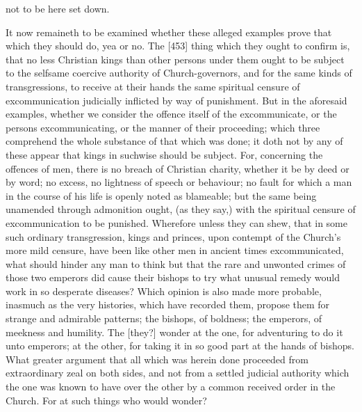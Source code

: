 not to be here set down.

It now remaineth to be examined whether these alleged examples prove that which they should do, yea or no. The [453] thing which they ought to confirm is, that no less Christian kings than other persons under them ought to be subject to the selfsame coercive authority of Church-governors, and for the same kinds of transgressions, to receive at their hands the same spiritual censure of excommunication judicially inflicted by way of punishment. But in the aforesaid examples, whether we consider the offence itself of the excommunicate, or the persons excommunicating, or the manner of their proceeding; which three comprehend the whole substance of that which was done; it doth not by any of these appear that kings in suchwise should be subject. For, concerning the offences of men, there is no breach of Christian charity, whether it be by deed or by word; no excess, no lightness of speech or behaviour; no fault for which a man in the course of his life is openly noted as blameable; but the same being unamended through admonition ought, (as they say,) with the spiritual censure of excommunication to be punished. Wherefore unless they can shew, that in some such ordinary transgression, kings and princes, upon contempt of the Church’s more mild censure, have been like other men in ancient times excommunicated, what should hinder any man to think but that the rare and unwonted crimes of those two emperors did cause their bishops to try what unusual remedy would work in so desperate diseases? Which opinion is also made more probable, inasmuch as the very histories, which have recorded them, propose them for strange and admirable patterns; the bishops, of boldness; the emperors, of meekness and humility. The [they?] wonder at the one, for adventuring to do it unto emperors; at the other, for taking it in so good part at the hands of bishops. What greater argument that all which was herein done proceeded from extraordinary zeal on both sides, and not from a settled judicial authority which the one was known to have over the other by a common received order in the Church. For at such things who would wonder?

